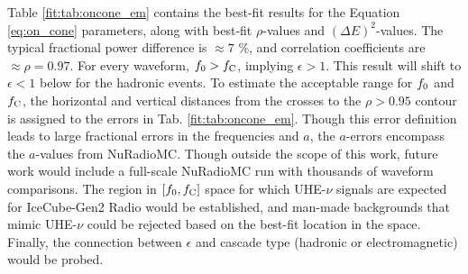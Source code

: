 \documentclass[amsmath,amssymb,aps,prd,10pt,twocolumn]{revtex4}
\begin{document}
Table \ref{fit:tab:oncone_em} contains the best-fit results for the Equation \ref{eq:on_cone} parameters, along with best-fit $\rho$-values and $(\Delta E)^2$-values.  The typical fractional power difference is $\approx 7$ \%, and correlation coefficients are $\approx \rho = 0.97$.  For every waveform, $f_{\rm 0} > f_{\rm C}$, implying $\epsilon>1$.  This result will shift to $\epsilon<1$ below for the hadronic events.  To estimate the acceptable range for $f_{\rm 0}$ and $f_{\rm C}$, the horizontal and vertical distances from the crosses to the $\rho > 0.95$ contour is assigned to the errors in Tab. \ref{fit:tab:oncone_em}.  Though this error definition leads to large fractional errors in the frequencies and $a$, the $a$-errors encompass the $a$-values from NuRadioMC.  Though outside the scope of this work, future work would include a full-scale NuRadioMC run with thousands of waveform comparisons.  The region in $[f_{\rm 0},f_{\rm C}]$ space for which UHE-$\nu$ signals are expected for IceCube-Gen2 Radio would be established, and man-made backgrounds that mimic UHE-$\nu$ could be rejected based on the best-fit location in the space.  Finally, the connection between $\epsilon$ and cascade type (hadronic or electromagnetic) would be probed.
\end{document}
